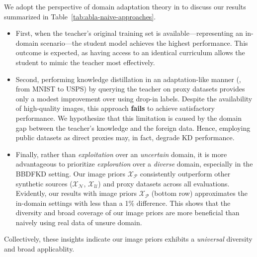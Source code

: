 \begin{foldable} %
    We adopt the perspective of domain adaptation theory in \citet{ben2010theory} to discuss our results summarized in Table~\ref{tab:abla-naive-approaches}.
    \begin{itemize}
        \item First, when the teacher's original training set is available---representing an in-domain scenario---the student model achieves the highest performance.
            This outcome is expected, as having access to an identical curriculum allows the student to mimic the teacher most effectively.
        \item Second, performing knowledge distillation in an adaptation-like manner (\eg, from MNIST to USPS) by querying the teacher on proxy datasets provides only a modest improvement over using drop-in labels.
            Despite the availability of high-quality images, this approach \textbf{fails} to achieve satisfactory performance.
            We hypothesize that this limitation is caused by the domain gap between the teacher's knowledge and the foreign data.
            Hence, employing public datasets as direct proxies may, in fact, degrade KD performance.
        \item Finally, rather than \textit{exploitation} over an \textit{uncertain} domain, it is more advantageous to prioritize \textit{exploration} over a \textit{diverse} domain, especially in the BBDFKD setting.
            Our image priors $\mathcal{X}_\mathcal{P}$ consistently outperform other synthetic sources ($\mathcal{X}_\mathcal{N}$, $\mathcal{X}_\mathcal{U}$) and proxy datasets across all evaluations.
            Evidently, our results with image priors $\mathcal{X}_\mathcal{P}$ (bottom row) approximates the in-domain settings with less than a 1\% difference.
            This shows that the diversity and broad coverage of our image priors are more beneficial than naively using real data of unsure domain.
    \end{itemize}
    Collectively, these insights indicate our image priors exhibits a \textit{universal} diversity and broad applicablity.
\end{foldable}



